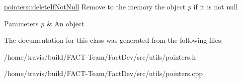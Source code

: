 \hyperlink{classUtils_1_1pointers_ad9a69267f8f8fff8a092fcee8a3d49ac}{pointers\-::delete\-If\-Not\-Null} Remove to the memory the object {\itshape p} if it is not null 


\begin{DoxyParams}{Parameters}
{\em p} & An object \\
\hline
\end{DoxyParams}


The documentation for this class was generated from the following files\-:\begin{DoxyCompactItemize}
\item 
/home/travis/build/\-F\-A\-C\-T-\/\-Team/\-Fact\-Dev/src/utils/pointers.\-h\item 
/home/travis/build/\-F\-A\-C\-T-\/\-Team/\-Fact\-Dev/src/utils/pointers.\-cpp\end{DoxyCompactItemize}

